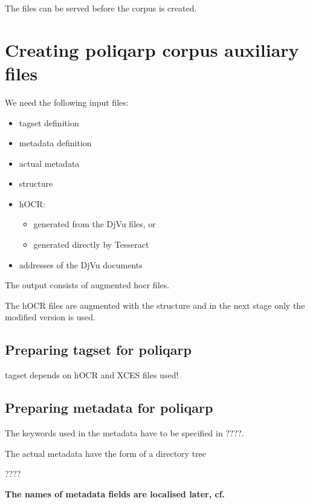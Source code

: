 \documentclass[runningheads,a4paper]{llncs}
\begin{document}
The files can be served before the corpus is created.

\section{Creating poliqarp corpus auxiliary files}
\label{sec:creat-poliq-corp-1}

We need the following input files:

\begin{itemize}
\item tagset definition
\item metadata definition
\item actual metadata
\item structure
\item hOCR:
  \begin{itemize}
  \item generated from the DjVu files, or
  \item generated directly by Tesseract
  \end{itemize}
\item addresses of the DjVu documents 
\end{itemize}

The output consists of augmented hocr files.

The hOCR files are augmented with the structure and in the next stage
only the modified version is used.

\subsection{Preparing tagset for poliqarp}
\label{sec:prep-tags-poliq}

tagset depends on hOCR and XCES files used!


\subsection{Preparing metadata for poliqarp}
\label{sec:preparing-matadata}

The keywords used in the metadata have to be specified in ????.

The actual metadata have the form of a directory tree

????



\textbf{The names of metadata fields are localised later, cf.}
\end{document}
